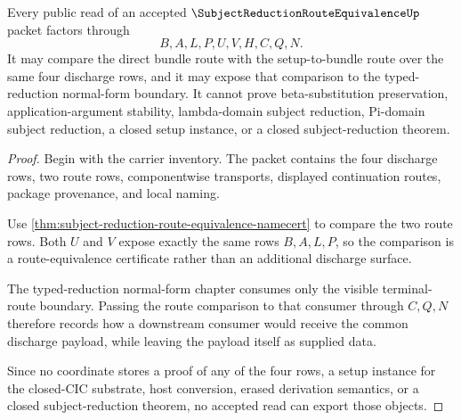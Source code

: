 \begin{theorem}
\label{thm:subject-reduction-route-equivalence-nonescape}
Every public read of an accepted $\SubjectReductionRouteEquivalenceUp$ packet factors through
$$
B,A,L,P,U,V,H,C,Q,N.
$$
It may compare the direct bundle route with the setup-to-bundle route over the same four discharge rows, and it may expose that comparison to the typed-reduction normal-form boundary. It cannot prove beta-substitution preservation, application-argument stability, lambda-domain subject reduction, Pi-domain subject reduction, a closed setup instance, or a closed subject-reduction theorem.
\end{theorem}
\begin{proof}
Begin with the carrier inventory. The packet contains the four discharge rows, two route rows, componentwise transports, displayed continuation routes, package provenance, and local naming.

Use \autoref{thm:subject-reduction-route-equivalence-namecert} to compare the two route rows. Both $U$ and $V$ expose exactly the same rows $B,A,L,P$, so the comparison is a route-equivalence certificate rather than an additional discharge surface.

The typed-reduction normal-form chapter consumes only the visible terminal-route boundary. Passing the route comparison to that consumer through $C,Q,N$ therefore records how a downstream consumer would receive the common discharge payload, while leaving the payload itself as supplied data.

Since no coordinate stores a proof of any of the four rows, a setup instance for the closed-CIC substrate, host conversion, erased derivation semantics, or a closed subject-reduction theorem, no accepted read can export those objects.
\end{proof}
